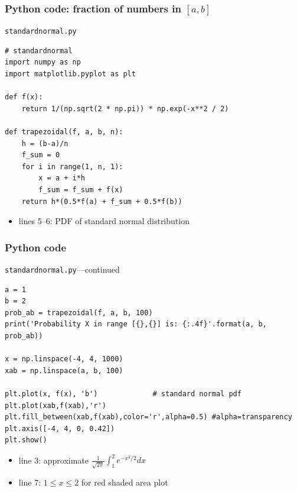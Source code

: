 \documentclass[english,14pt]{beamer}
\begin{document}

\begin{frame}[fragile]

\frametitle{Python code: fraction of numbers in $[a,b]$}

\texttt{standardnormal.py}
\begin{lstlisting}[style=CStyle,basicstyle=\scriptsize]
# standardnormal
import numpy as np
import matplotlib.pyplot as plt

def f(x):
    return 1/(np.sqrt(2 * np.pi)) * np.exp(-x**2 / 2)

def trapezoidal(f, a, b, n):
    h = (b-a)/n
    f_sum = 0
    for i in range(1, n, 1):
        x = a + i*h
        f_sum = f_sum + f(x)
    return h*(0.5*f(a) + f_sum + 0.5*f(b))
\end{lstlisting}

\begin{itemize}
	\item lines 5--6: PDF of standard normal distribution
\end{itemize}

\end{frame}


\begin{frame}[fragile]

\frametitle{Python code}

\texttt{standardnormal.py}---continued
\begin{lstlisting}[style=CStyle,basicstyle=\scriptsize]
a = 1
b = 2
prob_ab = trapezoidal(f, a, b, 100)
print('Probability X in range [{},{}] is: {:.4f}'.format(a, b, prob_ab))

x = np.linspace(-4, 4, 1000)
xab = np.linspace(a, b, 100)

plt.plot(x, f(x), 'b')             # standard normal pdf
plt.plot(xab,f(xab),'r')
plt.fill_between(xab,f(xab),color='r',alpha=0.5) #alpha=transparency
plt.axis([-4, 4, 0, 0.42])
plt.show()
\end{lstlisting}

\begin{itemize}
	\item line 3: approximate $\frac{1}{\sqrt{2\pi}} \int_1^2 e^{-x^2/2} dx$
	\item line 7: $1 \leq x \leq 2$ for red shaded area plot
\end{itemize}

\end{frame}
\end{document}
